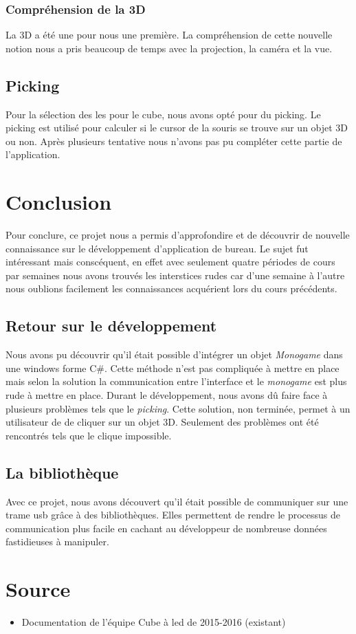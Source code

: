 \documentclass[a4paper,12pt]{article}
\begin{document}
\subsubsection{Compréhension de la 3D}
La 3D a été une pour nous une première. La compréhension de cette nouvelle notion nous a pris beaucoup de temps avec la projection, la caméra et la vue.

\subsection{Picking}
Pour la sélection des les pour le cube, nous avons opté pour du picking. Le picking est utilisé pour calculer si le cursor de la souris se trouve sur un objet 3D ou non. Après plusieurs tentative nous n'avons pas pu compléter cette partie de l'application.
\newpage

\section{Conclusion}
Pour conclure, ce projet nous a permis d'approfondire et de découvrir de nouvelle connaissance sur le développement d'application de bureau. Le sujet fut intéressant mais conscéquent, en effet avec seulement quatre périodes de cours par semaines nous avons trouvés les interstices rudes car d'une semaine à l'autre nous oublions facilement les connaissances acquérient lors du cours précédents.

\subsection{Retour sur le développement}
Nous avons pu découvrir qu'il était possible d'intégrer un objet \emph{Monogame} dans une windows forme C\#. Cette méthode n'est pas compliquée à mettre en place mais selon la solution la communication entre l'interface et le \emph{monogame} est plus rude à mettre en place. Durant le développement, nous avons dû faire face à plusieurs problèmes tels que le \emph{picking}. Cette solution, non terminée, permet à un utilisateur de de cliquer sur un objet 3D. Seulement des problèmes ont été rencontrés tels que le clique impossible.

\subsection{La bibliothèque}
Avec ce projet, nous avons découvert qu'il était possible de communiquer sur une trame usb grâce à des bibliothèques. Elles permettent de rendre le processus de communication plus facile en cachant au développeur de nombreuse données fastidieuses à manipuler.
\newpage

\section{Source}
\begin{itemize}
	\item Documentation de l'équipe Cube à led de 2015-2016 (existant)
\end{itemize}

\newpage
\listoffigures
\end{document}
